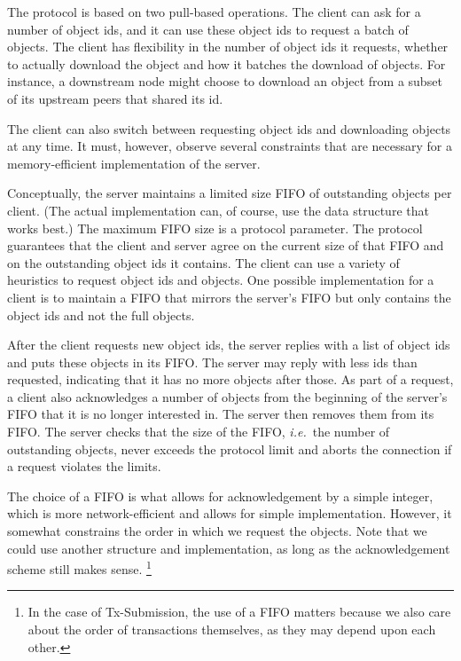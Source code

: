 The protocol is based on two pull-based operations. The client can ask for a
number of object ids, and it can use these object ids to request a batch of
objects. The client has flexibility in the number of object ids it requests,
whether to actually download the object and how it batches the download of
objects. For instance, a downstream node might choose to download an object from
a subset of its upstream peers that shared its id.

The client can also switch between requesting object ids and downloading objects
at any time. It must, however, observe several constraints that are necessary
for a memory-efficient implementation of the server.

Conceptually, the server maintains a limited size FIFO of outstanding objects
per client. (The actual implementation can, of course, use the data structure
that works best.) The maximum FIFO size is a protocol parameter. The protocol
guarantees that the client and server agree on the current size of that FIFO and
on the outstanding object ids it contains. The client can use a variety of heuristics to
request object ids and objects. One possible implementation for a client is to
maintain a FIFO that mirrors the server's FIFO but only contains the object ids
and not the full objects.

After the client requests new object ids, the server replies with a list of
object ids and puts these objects in its FIFO. The server may reply with less
ids than requested, indicating that it has no more objects after those. As part
of a request, a client also acknowledges a number of objects from the beginning
of the server's FIFO that it is no longer interested in. The server then removes
them from its FIFO. The server checks that the size of the FIFO, {\em i.e.}\ the
number of outstanding objects, never exceeds the protocol limit and aborts the
connection if a request violates the limits.

The choice of a FIFO is what allows for acknowledgement by a simple integer,
which is more network-efficient and allows for simple implementation. However,
it somewhat constrains the order in which we request the objects. Note that we
could use another structure and implementation, as long as the acknowledgement
scheme still makes sense.%
%
\footnote{In the case of Tx-Submission, the use of a FIFO matters because we
also care about the order of transactions themselves, as they may depend upon
each other.}

